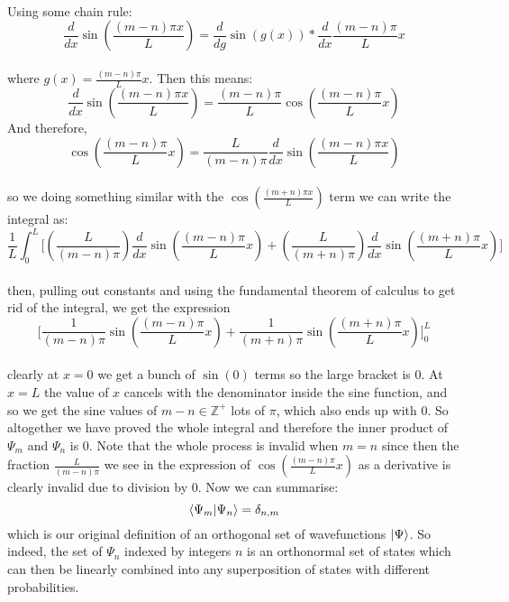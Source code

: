     \\
    Using some chain rule:
    $$
    \frac{d}{dx}\sin\left(\frac{(m-n)\pi x}{L}\right)= \frac{d}{dg}\sin(g(x))*\frac{d}{dx}\frac{(m-n)\pi}{L}x
    $$
    \\
    where $g(x) = \frac{(m-n)\pi}{L}x$. Then this means:
    $$
    \frac{d}{dx}\sin\left(\frac{(m-n)\pi x}{L}\right)=\frac{(m-n)\pi}{L}\cos\left(\frac{(m-n)\pi}{L}x\right)
    $$
    And therefore,
    $$
    \cos\left(\frac{(m-n)\pi}{L}x\right)= \frac{L}{(m-n)\pi}\frac{d}{dx}\sin\left(\frac{(m-n)\pi x}{L}\right)
    $$
    \\
    so we doing something similar with the $\cos(\frac{(m+n)\pi x}{L})$ term we can write the integral as:
    $$
    \frac{1}{L}\int_{0}^{L}\biggl[\left(\frac{L}{(m-n)\pi}\right)\frac{d}{dx}\sin\left(\frac{(m-n)\pi}{L}x\right)+\left(\frac{L}{(m+n)\pi}\right)\frac{d}{dx}\sin\left(\frac{(m+n)\pi}{L}x\right)\biggr]
    $$
    \\
    then, pulling out constants and using the fundamental theorem of calculus to get rid of the integral, we get the expression
    $$
    \biggl[\frac{1}{(m-n)\pi}\sin\left(\frac{(m-n)\pi}{L}x\right)+\frac{1}{(m+n)\pi}\sin\left(\frac{(m+n)\pi}{L}x\right)\biggr]_{0}^{L}
    $$
    \\
    clearly at $x=0$ we get a bunch of $\sin(0)$ terms so the large bracket is 0. At $x=L$ the value of $x$ cancels with the denominator inside the sine function, and so we get the sine values of $m-n\in\mathbb{Z}^{+}$ lots of $\pi$, which also ends up with 0. So altogether we have proved the whole integral and therefore the inner product of $\Psi_m$ and $\Psi_n$ is $0$. Note that the whole process is invalid when $m=n$ since then the fraction $\frac{L}{(m-n)\pi}$ we see in the expression of $\cos(\frac{(m-n)\pi}{L}x)$ as a derivative is clearly invalid due to division by $0$. Now we can summarise:
    $$
    \langle\Psi_{m}|\Psi_{n}\rangle = \delta_{n,m}
    $$
    which is our original definition of an orthogonal set of wavefunctions $|\Psi\rangle$. So indeed, the set of $\Psi_{n}$ indexed by integers $n$ is an orthonormal set of states which can then be linearly combined into any superposition of states with different probabilities.
